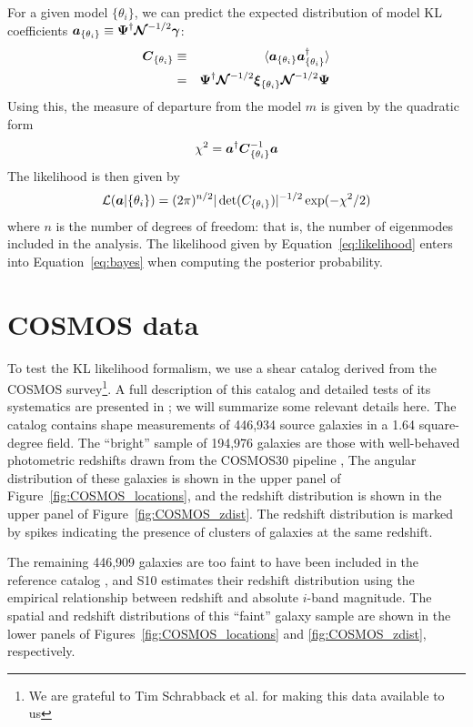 For a given model $\{\theta_i\}$, we can predict the expected distribution of model KL
coefficients $\boldsymbol{a}_{\{\theta_i\}} \equiv \boldsymbol{\Psi}^\dagger
\boldsymbol{\mathcal{N}}^{-1/2}\boldsymbol{\gamma}$:
\begin{eqnarray}
  \boldsymbol{C}_{\{\theta_i\}}
  & \equiv & \langle\boldsymbol{a}_{\{\theta_i\}}
  \boldsymbol{a}_{\{\theta_i\}}^\dagger\rangle\nonumber\\
  &=& \boldsymbol{\Psi}^\dagger \boldsymbol{\mathcal{N}}^{-1/2} 
  \boldsymbol{\xi}_{\{\theta_i\}}\boldsymbol{\mathcal{N}}^{-1/2}\boldsymbol{\Psi}
\end{eqnarray}
Using this, the measure of departure from the model $m$ is given by the
quadratic form
\begin{equation}
  \chi^2 = \boldsymbol{a}^\dagger\boldsymbol{C}_{\{\theta_i\}}^{-1}\boldsymbol{a}
\end{equation}
The likelihood is then given by
\begin{equation}
  \label{eq:likelihood}
  \mathcal{L}(\boldsymbol{a}|\{\theta_i\}) = 
  (2\pi)^{n/2} |\det(C_{\{\theta_i\}})|^{-1/2}
  \exp(-\chi^2/2)
\end{equation}
where $n$ is the number of degrees of freedom: that is, the number
of eigenmodes included in the analysis.  The likelihood given by
Equation~\ref{eq:likelihood} enters into Equation~\ref{eq:bayes} when
computing the posterior probability.

\section{COSMOS data}
\label{sec:data}
To test the KL likelihood formalism, we use a shear catalog derived from the
COSMOS survey\footnote{We are grateful to Tim Schrabback et al. for making 
this data available to us}.  A full description of this catalog and detailed 
tests of its systematics are presented in
\citet[][hereafter S10]{Schrabback10}; we will summarize some relevant
details here.
The catalog contains shape measurements of 446,934 source galaxies 
in a 1.64 square-degree field.
The ``bright'' sample of 194,976 galaxies are those with well-behaved
photometric redshifts drawn from the COSMOS30 pipeline
\citep[][S10]{Hildebrandt2009},  The angular distribution of these
galaxies is shown in the upper panel of Figure~\ref{fig:COSMOS_locations},
and the redshift distribution is shown in the upper panel of
Figure~\ref{fig:COSMOS_zdist}.  The redshift distribution is marked by
spikes indicating the presence of clusters of galaxies at the same redshift.

The remaining 446,909 galaxies are too faint to have been included
in the reference catalog \citep[the COSMOS30 redshifts are limited to
$i^+ < 25$; See][]{Ilbert09}, and S10 estimates their redshift distribution
using the empirical relationship between redshift and absolute $i$-band
magnitude.
The spatial and redshift distributions of this ``faint'' galaxy
sample are shown in the lower panels of Figures~\ref{fig:COSMOS_locations}
and \ref{fig:COSMOS_zdist}, respectively.

